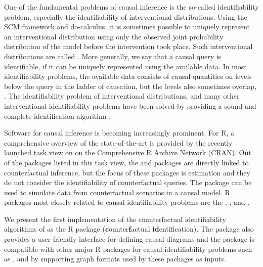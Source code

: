 
One of the fundamental problems of causal inference is the so-called identifiability problem, especially the identifiability of interventional distributions. Using the SCM framework and do-calculus, it is sometimes possible to uniquely represent an interventional distribution using only the observed joint probability distribution of the model before the intervention took place. Such interventional distributions are called . More generally, we say that a causal query is identifiable, if it can be uniquely represented using the available data. In most identifiability problems, the available data consists of causal quantities on levels below the query in the ladder of causation, but the levels also sometimes overlap, \citep[e.g.,][]{bareinboim2012zid,tikka2019surrogate,lee2019surrogate}. The identifiability problem of interventional distributions, and many other interventional identifiability problems have been solved by providing a sound and complete identification algorithm \citep[e.g.,][]{shpitser2006id, huang2006complete, lee2019surrogate, kivva2022}.

Software for causal inference is becoming increasingly prominent. For R, a comprehensive overview of the state-of-the-art is provided by the recently launched task view on  on the Comprehensive R Archive Network (CRAN). Out of the packages listed in this task view, the  \citep{counterfactualpackage} and  \citep{whatifpackage} packages are directly linked to counterfactual inference, but the focus of these packages is estimation and they do not consider the identifiability of counterfactual queries. The  \citep{r6causal} package can be used to simulate data from counterfactual scenarios in a causal model. R packages most closely related to causal identifiability problems are the  \citep{tikka2017},  \citep{dosearch}, and  \citep{dagitty}.

We present the first implementation of the counterfactual identifiability algorithms of \citet{shpitser2007} \citep[see also][]{shpitser2008} as the R package  (\textbf{c}ounter\textbf{f}actual \textbf{id}entification). The  package also provides a user-friendly interface for defining causal diagrams and the package is compatible with other major R packages for causal identifiability problems such as ,  and  by supporting graph formats used by these packages as inputs.

